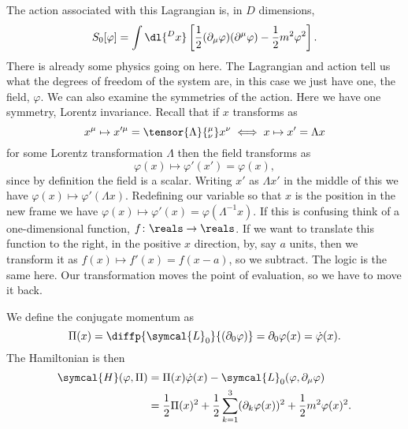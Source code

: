 \documentclass[fleqn]{NotesClass}
\newcommand{\lagrangianDensity}{\symcal{L}}
\newcommand{\hamiltonianDensity}{\symcal{H}}
\begin{document}
    The action associated with this Lagrangian is, in \(D\) dimensions,
    \begin{equation}
        S_0[\varphi] = \int \dl{^Dx} \left[ \frac{1}{2}(\partial_\mu\varphi)(\partial^\mu\varphi) - \frac{1}{2}m^2\varphi^2 \right].
    \end{equation}
    There is already some physics going on here.
    The Lagrangian and action tell us what the degrees of freedom of the system are, in this case we just have one, the field, \(\varphi\).
    We can also examine the symmetries of the action.
    Here we have one symmetry, Lorentz invariance.
    Recall that if \(x\) transforms as
    \begin{equation}
        x^\mu \mapsto x'^\mu = \tensor{\Lambda}{^\mu_\nu}x^\nu \iff x \mapsto x' = \Lambda x
    \end{equation}
    for some Lorentz transformation \(\Lambda\) then the field transforms as
    \begin{equation}
        \varphi(x) \mapsto \varphi'(x') = \varphi(x),
    \end{equation}
    since by definition the field is a scalar.
    Writing \(x'\) as \(\Lambda x'\) in the middle of this we have \(\varphi(x) \mapsto \varphi'(\Lambda x)\).
    Redefining our variable so that \(x\) is the position in the new frame we have \(\varphi(x) \mapsto \varphi'(x) = \varphi(\Lambda^{-1}x)\).
    If this is confusing think of a one-dimensional function, \(f \colon \reals \to \reals\).
    If we want to translate this function to the right, in the positive \(x\) direction, by, say \(a\) units, then we transform it as \(f(x) \mapsto f'(x) = f(x - a)\), so we subtract.
    The logic is the same here.
    Our transformation moves the point of evaluation, so we have to move it back.
    
    We define the conjugate momentum as
    \begin{equation}
        \Pi(x) = \diffp{\lagrangianDensity_0}{(\partial_0\varphi)} = \partial_0\varphi(x) = \dot{\varphi}(x).
    \end{equation}
    The Hamiltonian is then
    \begin{align}
        \hamiltonianDensity(\varphi, \Pi) &= \Pi(x)\dot{\varphi}(x) - \lagrangianDensity_0(\varphi, \partial_\mu \varphi)\\
        &= \frac{1}{2}\Pi(x)^2 + \frac{1}{2}\sum_{k = 1}^{3} (\partial_k\varphi(x))^2 + \frac{1}{2} m^2\varphi(x)^2.
    \end{align}
    
\end{document}
